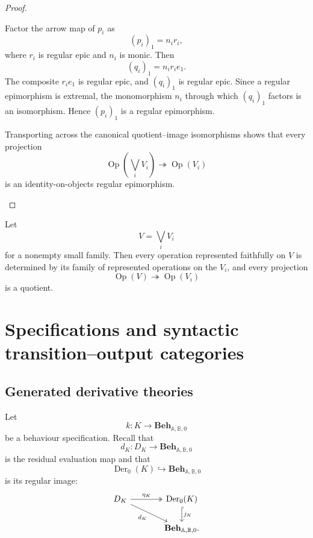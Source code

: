 \begin{proof}
\begin{enumerate}
        Factor the arrow map of \(p_i\) as
        \[
            (p_i)_1
            =
            n_i r_i,
        \]
        where \(r_i\) is regular epic and \(n_i\) is monic. Then
        \[
            (q_i)_1
            =
            n_i r_i e_1.
        \]
        The composite \(r_i e_1\) is regular epic, and
        \((q_i)_1\) is regular epic. Since a regular epimorphism is extremal,
        the monomorphism \(n_i\) through which \((q_i)_1\) factors is an
        isomorphism. Hence \((p_i)_1\) is a regular epimorphism.

        Transporting across the canonical quotient--image isomorphisms shows
        that every projection
        \[
            \operatorname{Op}
            \left(
                \bigvee_iV_i
            \right)
            \twoheadrightarrow
            \operatorname{Op}(V_i)
        \]
        is an identity-on-objects regular epimorphism.
    \end{enumerate}
\end{proof}

\begin{corollary}
\label{cor:to-generated-theory-subdirect}
    Let
    \[
        V=\bigvee_iV_i
    \]
    for a nonempty small family. Then every operation represented faithfully
    on \(V\) is determined by its family of represented operations on the
    \(V_i\), and every projection
    \[
        \operatorname{Op}(V)\twoheadrightarrow\operatorname{Op}(V_i)
    \]
    is a quotient.
\end{corollary}

\section{Specifications and syntactic transition--output categories}
\label{sec:to-syntactic-transition-output-categories}

\subsection{Generated derivative theories}
\label{subsec:to-generated-derivative-theories}

Let
\[
    k:K\to
    \mathbf{Beh}_{\mathbb A,\mathbb B,0}
\]
be a behaviour specification. Recall that
\[
    d_K:
    D_K\to
    \mathbf{Beh}_{\mathbb A,\mathbb B,0}
\]
is the residual evaluation map and that
\[
    \operatorname{Der}_0(K)
    \hookrightarrow
    \mathbf{Beh}_{\mathbb A,\mathbb B,0}
\]
is its regular image:
\[
\begin{tikzcd}[column sep=large]
    D_K
        \arrow[r, two heads, "\eta_K"]
        \arrow[dr, "d_K"']
    &
    \operatorname{Der}_0(K)
        \arrow[d, hook, "j_K"]
    \\
    &
    \mathbf{Beh}_{\mathbb A,\mathbb B,0}.
\end{tikzcd}
\]

